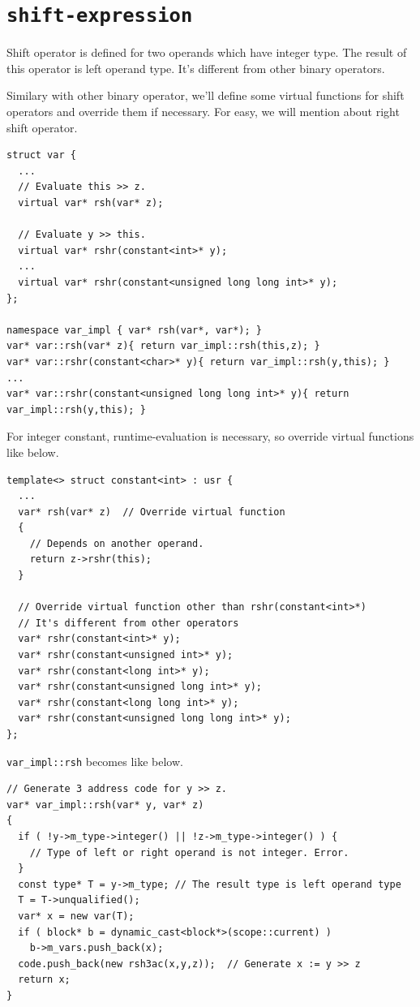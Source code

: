 \section{\tt{shift-expression}}
\label{expr_e026}
Shift operator is defined for two operands which have
integer type. The result of this operator is left operand
type. It's different from other binary operators.

Similary with other binary operator, we'll define some virtual
functions for shift operators and override them if necessary.
For easy, we will mention about right shift operator.
\begin{verbatim}
struct var {
  ...
  // Evaluate this >> z.
  virtual var* rsh(var* z);

  // Evaluate y >> this.
  virtual var* rshr(constant<int>* y);
  ...
  virtual var* rshr(constant<unsigned long long int>* y);
};

namespace var_impl { var* rsh(var*, var*); }
var* var::rsh(var* z){ return var_impl::rsh(this,z); }
var* var::rshr(constant<char>* y){ return var_impl::rsh(y,this); }
...
var* var::rshr(constant<unsigned long long int>* y){ return var_impl::rsh(y,this); }
\end{verbatim}
For integer constant, runtime-evaluation is necessary, so override
virtual functions like below.
\begin{verbatim}
template<> struct constant<int> : usr {
  ...
  var* rsh(var* z)  // Override virtual function
  {
    // Depends on another operand.
    return z->rshr(this);
  }

  // Override virtual function other than rshr(constant<int>*)
  // It's different from other operators
  var* rshr(constant<int>* y);
  var* rshr(constant<unsigned int>* y);
  var* rshr(constant<long int>* y);
  var* rshr(constant<unsigned long int>* y);
  var* rshr(constant<long long int>* y);
  var* rshr(constant<unsigned long long int>* y);
};
\end{verbatim}
{\tt{var\_impl::rsh}} becomes like below.
\begin{verbatim}
// Generate 3 address code for y >> z.
var* var_impl::rsh(var* y, var* z)
{
  if ( !y->m_type->integer() || !z->m_type->integer() ) {
    // Type of left or right operand is not integer. Error.
  }
  const type* T = y->m_type; // The result type is left operand type
  T = T->unqualified();
  var* x = new var(T);
  if ( block* b = dynamic_cast<block*>(scope::current) )
    b->m_vars.push_back(x);
  code.push_back(new rsh3ac(x,y,z));  // Generate x := y >> z
  return x;
}
\end{verbatim}

